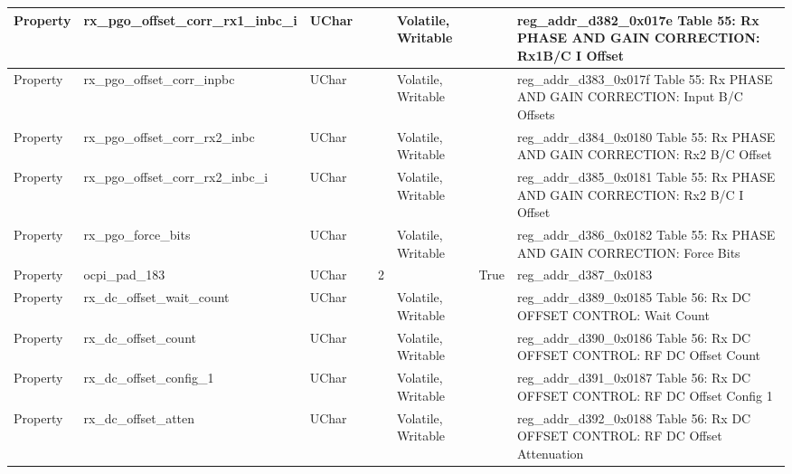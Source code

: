 \documentclass{article}
\begin{document}
\begin{scriptsize}
\begin{longtable}{|p{2cm}|p{5cm}|p{1cm}|p{2cm}|p{2cm}|p{1.75cm}|p{1.5cm}|p{5.1cm}|}
  \hline
  Property & rx\_pgo\_offset\_corr\_rx1\_inbc\_i                      & UChar &                  &                  & Volatile,  Writable &         & reg\_addr\_d382\_0x017e Table 55: Rx PHASE AND GAIN CORRECTION: Rx1B/C I Offset \\
  \hline
  Property & rx\_pgo\_offset\_corr\_inpbc                             & UChar &                  &                  & Volatile,  Writable &         & reg\_addr\_d383\_0x017f Table 55: Rx PHASE AND GAIN CORRECTION: Input B/C Offsets \\
  \hline
  Property & rx\_pgo\_offset\_corr\_rx2\_inbc                         & UChar &                  &                  & Volatile,  Writable &         & reg\_addr\_d384\_0x0180 Table 55: Rx PHASE AND GAIN CORRECTION: Rx2 B/C Offset \\
  \hline
  Property & rx\_pgo\_offset\_corr\_rx2\_inbc\_i                      & UChar &                  &                  & Volatile,  Writable &         & reg\_addr\_d385\_0x0181 Table 55: Rx PHASE AND GAIN CORRECTION: Rx2 B/C I Offset \\
  \hline
  Property & rx\_pgo\_force\_bits                                     & UChar &                  &                  & Volatile,  Writable &         & reg\_addr\_d386\_0x0182 Table 55: Rx PHASE AND GAIN CORRECTION: Force Bits \\
  \hline
  Property & ocpi\_pad\_183                                           & UChar &                  & 2                &                     & True    & reg\_addr\_d387\_0x0183 \\
  \hline
  Property & rx\_dc\_offset\_wait\_count                              & UChar &                  &                  & Volatile,  Writable &         & reg\_addr\_d389\_0x0185 Table 56: Rx DC OFFSET CONTROL: Wait Count \\
  \hline
  Property & rx\_dc\_offset\_count                                    & UChar &                  &                  & Volatile,  Writable &         & reg\_addr\_d390\_0x0186 Table 56: Rx DC OFFSET CONTROL: RF DC Offset Count \\
  \hline
  Property & rx\_dc\_offset\_config\_1                                & UChar &                  &                  & Volatile,  Writable &         & reg\_addr\_d391\_0x0187 Table 56: Rx DC OFFSET CONTROL: RF DC Offset Config 1 \\
  \hline
  Property & rx\_dc\_offset\_atten                                    & UChar &                  &                  & Volatile,  Writable &         & reg\_addr\_d392\_0x0188 Table 56: Rx DC OFFSET CONTROL: RF DC Offset Attenuation \\

\end{longtable}
\end{scriptsize}
\end{document}
